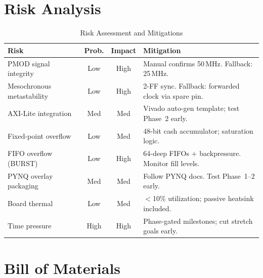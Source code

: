 \documentclass[conference]{IEEEtran}
\begin{document}
\section{Risk Analysis}

\begin{table}[h]
\centering
\caption{Risk Assessment and Mitigations}
\label{tab:risks}
\begin{tabular}{@{}L{2.2cm}ccL{3cm}@{}}
\toprule
\textbf{Risk} & \textbf{Prob.} & \textbf{Impact} & \textbf{Mitigation} \\
\midrule
PMOD signal integrity & Low & High & Manual confirms 50\,MHz. Fallback: 25\,MHz. \\
\addlinespace
Mesochronous metastability & Low & High & 2-FF sync. Fallback: forwarded clock via spare pin. \\
\addlinespace
AXI-Lite integration & Med & Med & Vivado auto-gen template; test Phase~2 early. \\
\addlinespace
Fixed-point overflow & Low & Med & 48-bit cash accumulator; saturation logic. \\
\addlinespace
FIFO overflow (BURST) & Low & High & 64-deep FIFOs + backpressure. Monitor fill levels. \\
\addlinespace
PYNQ overlay packaging & Med & Med & Follow PYNQ docs. Test Phase~1--2 early. \\
\addlinespace
Board thermal & Low & Med & $<$10\% utilization; passive heatsink included. \\
\addlinespace
Time pressure & High & High & Phase-gated milestones; cut stretch goals early. \\
\bottomrule
\end{tabular}
\end{table}

\section{Bill of Materials}
\end{document}
